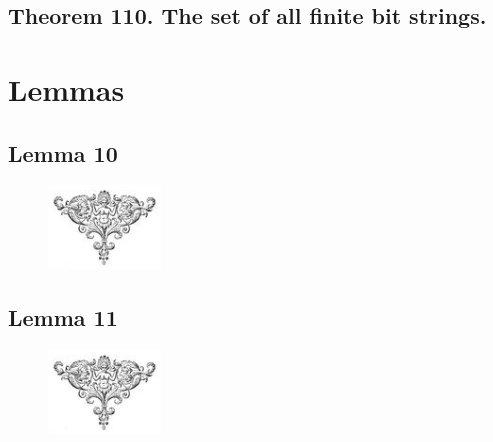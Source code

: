 \documentclass[preview]{standalone}
\begin{document}
\subsection[The set of all finite bit strings is countable.]{
    \color{section} Theorem 110. \color{black} The set of all finite bit strings.
}



\section{Lemmas}
\subsection[Lemma 10]{\color{section}Lemma 10}

\vspace{2\baselineskip}
\begin{figure}[!h]
    \centering
    \includegraphics[width=3cm]{../resources/jpg/2.4.sequences.and.summations/symbol6.jpg}
\end{figure}
\pagebreak


\subsection[Lemma 11]{\color{section}Lemma 11}

\begin{figure}[!h]
    \centering
    \includegraphics[width=3cm]{../resources/jpg/2.4.sequences.and.summations/symbol6.jpg}
\end{figure}
\pagebreak


\end{document}
